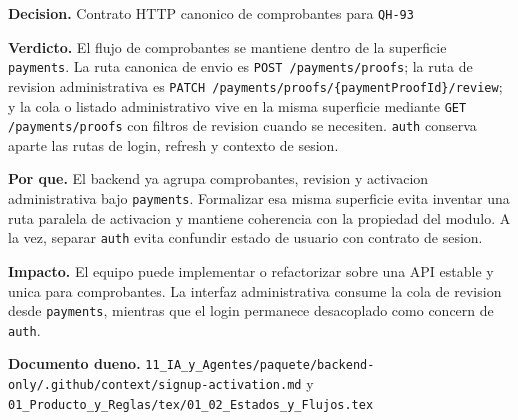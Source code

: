 \begin{docnote}
\textbf{Decision.} Contrato HTTP canonico de comprobantes para \texttt{QH-93}

\textbf{Verdicto.} El flujo de comprobantes se mantiene dentro de la superficie \texttt{payments}. La ruta canonica de envio es \texttt{POST /payments/proofs}; la ruta de revision administrativa es \texttt{PATCH /payments/proofs/\{paymentProofId\}/review}; y la cola o listado administrativo vive en la misma superficie mediante \texttt{GET /payments/proofs} con filtros de revision cuando se necesiten. \texttt{auth} conserva aparte las rutas de login, refresh y contexto de sesion.

\textbf{Por que.} El backend ya agrupa comprobantes, revision y activacion administrativa bajo \texttt{payments}. Formalizar esa misma superficie evita inventar una ruta paralela de activacion y mantiene coherencia con la propiedad del modulo. A la vez, separar \texttt{auth} evita confundir estado de usuario con contrato de sesion.

\textbf{Impacto.} El equipo puede implementar o refactorizar sobre una API estable y unica para comprobantes. La interfaz administrativa consume la cola de revision desde \texttt{payments}, mientras que el login permanece desacoplado como concern de \texttt{auth}.

\textbf{Documento dueno.} \texttt{11\_IA\_y\_Agentes/paquete/backend-only/.github/context/signup-activation.md} y \texttt{01\_Producto\_y\_Reglas/tex/01\_02\_Estados\_y\_Flujos.tex}
\end{docnote}

